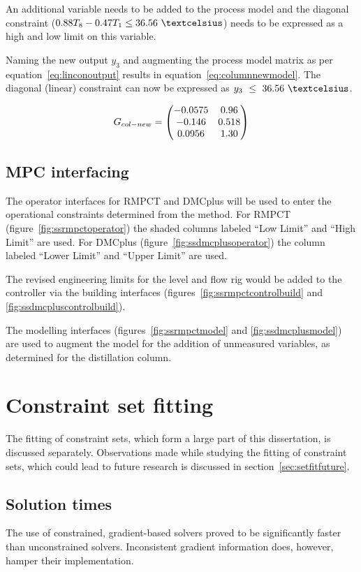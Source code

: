 An additional variable needs to be added to the process model and the diagonal constraint ($0.88T_8-0.47T_1\leq 36.56~\textcelsius$) needs to be expressed as a high and low limit on this variable.

Naming the new output $y_3$ and augmenting the process model matrix as per equation~\ref{eq:linconoutput} results in equation~\ref{eq:columnnewmodel}.
The diagonal (linear) constraint can now be expressed as {$y_3~\leq~36.56~\textcelsius$}.

\begin{equation}
  \label{eq:columnnewmodel}
  G_{col-new}= \bpm -0.0575 & 0.96 \\       %
                  -0.146  & 0.518 \\      %
                   0.0956 & 1.30 \\ \epm  %
\end{equation}

\subsection{MPC interfacing}
The operator interfaces for RMPCT and DMCplus will be used to enter the operational constraints determined from the method.
For RMPCT (figure~\ref{fig:ssrmpctoperator}) the shaded columns labeled ``Low Limit'' and ``High Limit'' are used.
For DMCplus (figure~\ref{fig:ssdmcplusoperator}) the column labeled ``Lower Limit'' and ``Upper Limit'' are used.

The revised engineering limits for the level and flow rig would be added to the controller via the building interfaces (figures~\ref{fig:ssrmpctcontrolbuild} and \ref{fig:ssdmcpluscontrolbuild}).

The modelling interfaces (figures~\ref{fig:ssrmpctmodel} and \ref{fig:ssdmcplusmodel}) are used to augment the model for the addition of unmeasured variables, as determined for the distillation column.

\section{Constraint set fitting}
The fitting of constraint sets, which form a large part of this dissertation, is discussed separately.
Observations made while studying the fitting of constraint sets, which could lead to future research is discussed in section~\ref{sec:setfitfuture}.

\subsection{Solution times}
The use of constrained, gradient-based solvers proved to be significantly faster than unconstrained solvers.
Inconsistent gradient information does, however, hamper their implementation.

